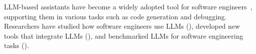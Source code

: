 LLM-based assistants have become a widely adopted tool for software engineers~\cite{stackoverflow2025survey}, supporting them in various tasks such as code generation and debugging.
Researchers have studied how software engineers use LLMs (\llmusage), developed new tools that integrate LLMs (\newtools), and benchmarked LLMs for software engineering tasks (\benchmarkingtasks).
